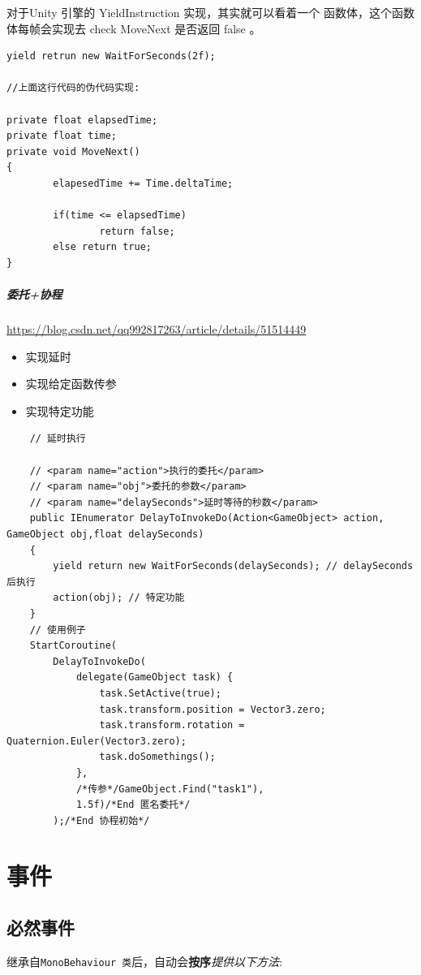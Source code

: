 \documentclass[UTF8,a4paper,12pt]{ctexbook}
\begin{document}
			    对于Unity 引擎的 YieldInstruction 实现，其实就可以看着一个 函数体，这个函数体每帧会实现去 check MoveNext 是否返回 false 。
			    
			    \begin{lstlisting}
yield retrun new WaitForSeconds(2f);

//上面这行代码的伪代码实现:

private float elapsedTime;
private float time;
private void MoveNext()
{
        elapesedTime += Time.deltaTime;
        
        if(time <= elapsedTime)
                return false;
        else return true;
}			    
			    \end{lstlisting}	
			
	\paragraph{委托+协程}
		\url{https://blog.csdn.net/qq992817263/article/details/51514449}
		
		\begin{itemize}
			\item 实现延时
			\item 实现给定函数传参
			\item 实现特定功能
		\end{itemize}
	
		\begin{lstlisting}
	// 延时执行

	// <param name="action">执行的委托</param>
	// <param name="obj">委托的参数</param>
	// <param name="delaySeconds">延时等待的秒数</param>
	public IEnumerator DelayToInvokeDo(Action<GameObject> action, GameObject obj,float delaySeconds)
	{
		yield return new WaitForSeconds(delaySeconds); // delaySeconds 后执行
		action(obj); // 特定功能
	}
	// 使用例子
	StartCoroutine(
		DelayToInvokeDo(
			delegate(GameObject task) {
				task.SetActive(true);
				task.transform.position = Vector3.zero;
				task.transform.rotation = Quaternion.Euler(Vector3.zero);
				task.doSomethings();
			},
			/*传参*/GameObject.Find("task1"),
			1.5f)/*End 匿名委托*/
		);/*End 协程初始*/
		\end{lstlisting}
		
\chapter{事件}
	\section{必然事件}
		继承自\verb|MonoBehaviour 类|后，自动会\textbf{按序}\textit{提供以下方法}:
		
\end{document}
